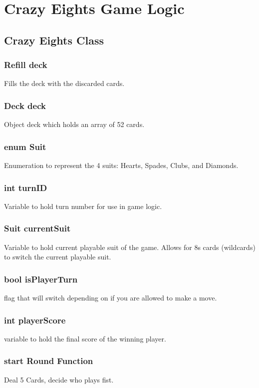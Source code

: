 \section{Crazy Eights Game Logic}

\subsection{Crazy Eights Class}

\subsubsection{Refill deck}
Fills the deck with the discarded cards.

\subsubsection{Deck deck}
    Object deck which holds an array of 52 cards.

\subsubsection{enum Suit}
    Enumeration to represent the 4 suits: Hearts, Spades, Clubs, and Diamonds.

\subsubsection{int turnID}
    Variable to hold turn number for use in game logic.

\subsubsection{Suit currentSuit}
    Variable to hold current playable suit of the game.  Allows for 8s cards (wildcards) to switch the current playable suit.
    
\subsubsection{bool isPlayerTurn}
    flag that will switch depending on if you are allowed to make a move.

\subsubsection{int playerScore}
    variable to hold the final score of the winning player.
    
\subsubsection{start Round Function}
    Deal 5 Cards, decide who plays fist.
    
